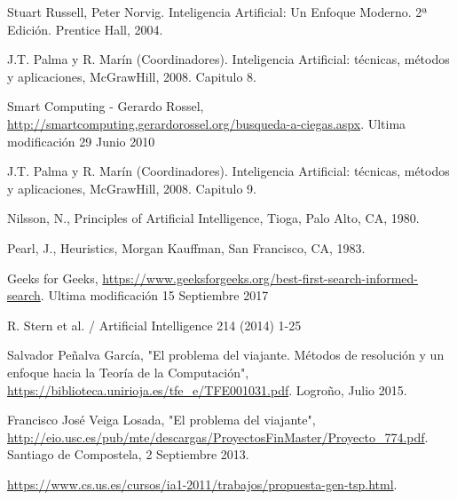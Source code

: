\documentclass[runningheads]{llncs}
\begin{document}
\begin{thebibliography}{8}
Stuart Russell, Peter Norvig. Inteligencia Artificial: Un Enfoque Moderno. 2ª
Edición. Prentice Hall, 2004.

J.T. Palma y R. Marín (Coordinadores). Inteligencia Artificial: técnicas,
métodos y aplicaciones, McGrawHill, 2008. Capitulo 8.

Smart Computing - Gerardo Rossel, \url{http://smartcomputing.gerardorossel.org/busqueda-a-ciegas.aspx}. Ultima modificación 29 Junio 2010

J.T. Palma y R. Marín (Coordinadores). Inteligencia Artificial: técnicas,
métodos y aplicaciones, McGrawHill, 2008. Capitulo 9.

Nilsson, N., Principles of Artificial Intelligence, Tioga, Palo Alto, CA, 1980.

Pearl, J., Heuristics, Morgan Kauffman, San Francisco, CA, 1983.

Geeks for Geeks, \url{https://www.geeksforgeeks.org/best-first-search-informed-search}. Ultima modificación 15 Septiembre 2017

R. Stern et al. / Artificial Intelligence 214 (2014) 1-25

Salvador Peñalva García, "El problema del viajante. Métodos de resolución y un enfoque hacia la Teoría de la Computación", \url{https://biblioteca.unirioja.es/tfe\_e/TFE001031.pdf}. Logroño, Julio 2015.

Francisco José Veiga Losada, "El problema del viajante", \url{http://eio.usc.es/pub/mte/descargas/ProyectosFinMaster/Proyecto\_774.pdf}. Santiago de Compostela, 2 Septiembre 2013.

\url{https://www.cs.us.es/cursos/ia1-2011/trabajos/propuesta-gen-tsp.html}.

\end{thebibliography}
\end{document}
